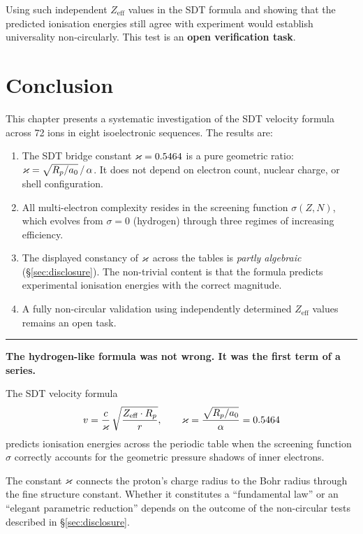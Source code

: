 Using such independent $Z_{\text{eff}}$ values in the SDT formula and showing that the predicted ionisation energies still agree with experiment would establish universality non-circularly.  This test is an \textbf{open verification task}.


\section{Conclusion}

This chapter presents a systematic investigation of the SDT velocity formula across 72 ions in eight isoelectronic sequences.  The results are:

\begin{enumerate}
  \item The SDT bridge constant $\varkappa = 0.5464$ is a pure geometric ratio: $\varkappa = \sqrt{R_p/a_0}\,/\,\alpha$.  It does not depend on electron count, nuclear charge, or shell configuration.

  \item All multi-electron complexity resides in the screening function $\sigma(Z, N)$, which evolves from $\sigma = 0$ (hydrogen) through three regimes of increasing efficiency.

  \item The displayed constancy of $\varkappa$ across the tables is \emph{partly algebraic} (\S\ref{sec:disclosure}).  The non-trivial content is that the formula predicts experimental ionisation energies with the correct magnitude.

  \item A fully non-circular validation using independently determined $Z_{\text{eff}}$ values remains an open task.
\end{enumerate}

\noindent\rule{\textwidth}{0.4pt}

\textbf{The hydrogen-like formula was not wrong.  It was the first term of a series.}

The SDT velocity formula
\begin{equation}
  v = \frac{c}{\varkappa}\,\sqrt{\frac{Z_{\text{eff}} \cdot R_p}{r}}, \qquad \varkappa = \frac{\sqrt{R_p/a_0}}{\alpha} = 0.5464
\end{equation}
predicts ionisation energies across the periodic table when the screening function $\sigma$ correctly accounts for the geometric pressure shadows of inner electrons.

The constant $\varkappa$ connects the proton's charge radius to the Bohr radius through the fine structure constant.  Whether it constitutes a ``fundamental law'' or an ``elegant parametric reduction'' depends on the outcome of the non-circular tests described in \S\ref{sec:disclosure}.

